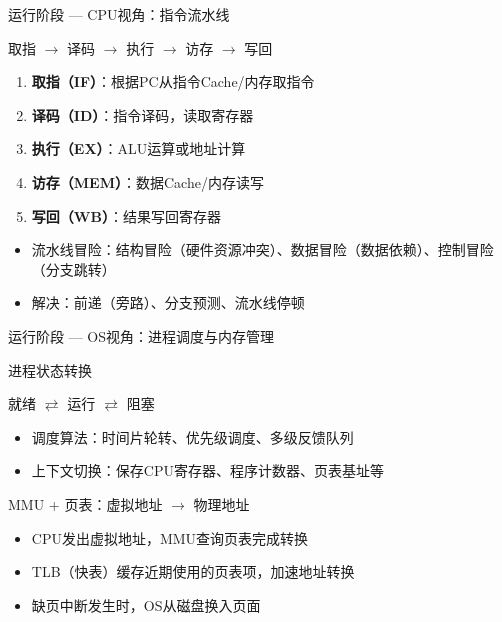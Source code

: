 \documentclass[10pt, aspectratio=169]{beamer}
\begin{document}
\begin{frame}{运行阶段 --- CPU视角：指令流水线}
    \begin{block}{取指 $\to$ 译码 $\to$ 执行 $\to$ 访存 $\to$ 写回}
        \begin{enumerate}
            \item \textbf{取指（IF）}：根据PC从指令Cache/内存取指令
            \item \textbf{译码（ID）}：指令译码，读取寄存器
            \item \textbf{执行（EX）}：ALU运算或地址计算
            \item \textbf{访存（MEM）}：数据Cache/内存读写
            \item \textbf{写回（WB）}：结果写回寄存器
        \end{enumerate}
    \end{block}
    \vspace{0.3em}
    \begin{itemize}
        \item 流水线冒险：结构冒险（硬件资源冲突）、数据冒险（数据依赖）、控制冒险（分支跳转）
        \item 解决：前递（旁路）、分支预测、流水线停顿
    \end{itemize}
\end{frame}

\begin{frame}{运行阶段 --- OS视角：进程调度与内存管理}
    \begin{block}{进程状态转换}
        \begin{center}
        就绪 $\rightleftarrows$ 运行 $\rightleftarrows$ 阻塞
        \end{center}
        \begin{itemize}
            \item 调度算法：时间片轮转、优先级调度、多级反馈队列
            \item 上下文切换：保存CPU寄存器、程序计数器、页表基址等
        \end{itemize}
    \end{block}
    \begin{block}{MMU + 页表：虚拟地址 $\to$ 物理地址}
        \begin{itemize}
            \item CPU发出虚拟地址，MMU查询页表完成转换
            \item TLB（快表）缓存近期使用的页表项，加速地址转换
            \item 缺页中断发生时，OS从磁盘换入页面
        \end{itemize}
    \end{block}
\end{frame}
\end{document}
